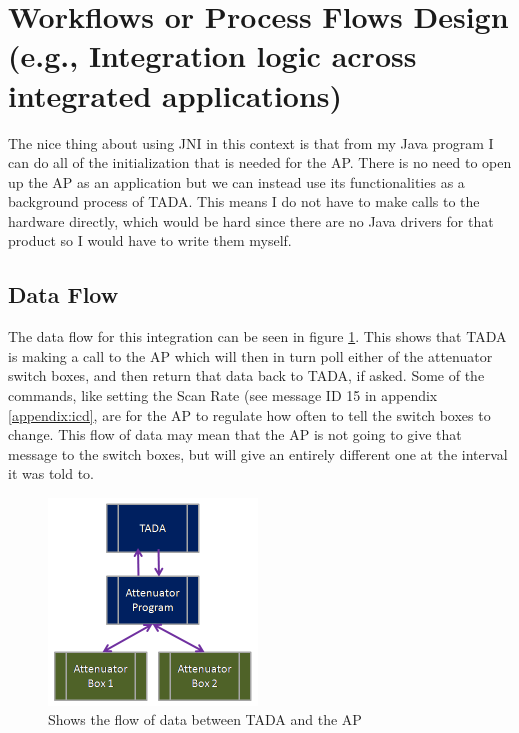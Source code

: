 \documentclass [a4paper,12pt,oneside,final,titlepage]{article}
\begin{document}
	
	\section{Workflows or Process Flows Design (e.g., Integration logic across integrated applications)}
	The nice thing about using JNI in this context is that from my Java program I can do all of the initialization that is needed for the AP. There is no need to open up the AP as an application but we can instead use its functionalities as a background process of TADA. This means I do not have to make calls to the hardware directly, which would be hard since there are no Java drivers for that product so I would have to write them myself.
	\subsection{Data Flow}
The data flow for this integration can be seen in figure \ref{fig:data}. This shows that TADA is making a call to the AP which will then in turn poll either of the attenuator switch boxes, and then return that data back to TADA, if asked. Some of the commands, like setting the Scan Rate (see message ID 15 in appendix \ref{appendix:icd}, are for the AP to regulate how often to tell the switch boxes to change. This flow of data may mean that the AP is not going to give that message to the switch boxes, but will give an entirely different one at the interval it was told to.
	\begin{figure}[htp]
		\centering
		\includegraphics[height=55mm]{dataFlow}
		\caption{Shows the flow of data between TADA and the AP}
		\label{fig:data}
	\end{figure}
\end{document}
